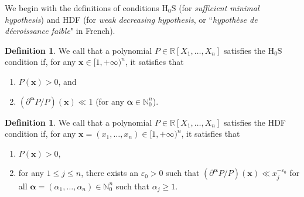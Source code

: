\documentclass[a4paper,12pt]{article}
\theoremstyle{definition}
\newtheorem{definition}[thm]{Definition}
\numberwithin{equation}{section}
\begin{document}
We begin with the definitions of conditions $\mathrm{H_0S}$ (for \textit{sufficient minimal hypothesis}) and HDF (for \textit{weak decreasing hypothesis}, or ``\textit{hypothèse de décroissance faible}" in French).

\begin{definition}\label{def_H0S}
We call that a polynomial $P\in \mathbb{R}[X_1,\ldots,X_n]$ satisfies the $\mathrm{H_0S}$ condition 
if, for any $\mathbf{x}\in [1,+\infty)^n$, it satisfies that
\begin{enumerate}[label=(\roman*)]
\item $P(\mathbf{x})>0$, and
\item $(\partial^{\boldsymbol{\alpha}}P/P)(\mathbf{x})\ll 1$ (for any $\boldsymbol{\alpha}\in \mathbb{N}_0^n$).
\end{enumerate}
\end{definition}

\begin{definition}\label{def_HDF}
We call that a polynomial $P\in \mathbb{R}[X_1,\ldots,X_n]$ satisfies the HDF condition 
if, for any $\mathbf{x}=(x_1,\ldots,x_n)\in [1,+\infty)^n$, it satisfies that
\begin{enumerate}[label=(\roman*)]
\item $P(\mathbf{x})>0$,
\item for any $1\leq j\leq n$, there exists an $\varepsilon_0>0$ such that 
$(\partial^{\boldsymbol{\alpha}}P/P)(\mathbf{x})\ll x_j^{-\varepsilon_0}$
for all $\boldsymbol{\alpha}=(\alpha_1,\ldots,\alpha_n)\in \mathbb{N}_0^n$
such that $\alpha_j\geq 1$.
\end{enumerate}
\end{definition}
\end{document}
